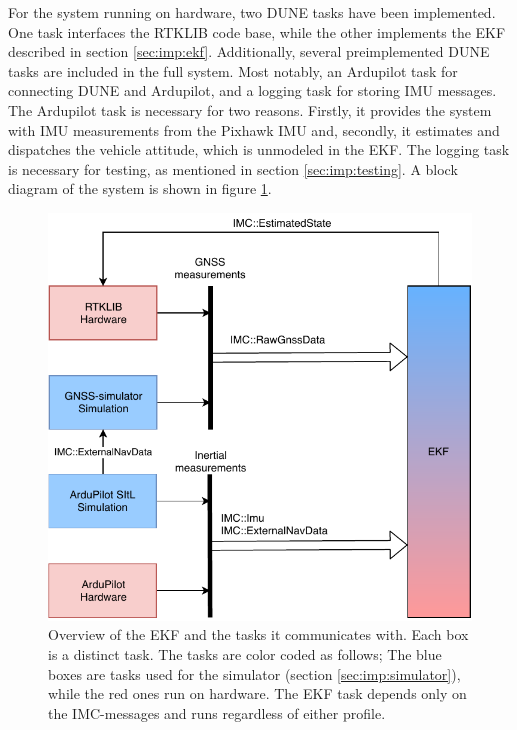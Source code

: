    
For the system running on hardware, two DUNE tasks have been implemented. One task interfaces the RTKLIB code base, while the other implements the EKF described in section \ref{sec:imp:ekf}. Additionally, several preimplemented DUNE tasks are included in the full system. Most notably, an Ardupilot task for connecting DUNE and Ardupilot, and a logging task for storing IMU messages. The Ardupilot task is necessary for two reasons. Firstly, it provides the system with IMU measurements from the Pixhawk IMU and, secondly, it estimates and dispatches the vehicle attitude, which is unmodeled in the EKF. The logging task is necessary for testing, as mentioned in section \ref{sec:imp:testing}. A block diagram of the system is shown in figure \ref{fig:dune-tasks}.\\

    \begin{figure}[!htbp]
    \centering
    \includegraphics[scale=0.8]{Implementation/Images/dune-tasks.pdf}
    \caption[Block diagram of the implemented system]{Overview of the EKF and the tasks it communicates with. Each box is a distinct task. The tasks are color coded as follows; The blue boxes are tasks used for the simulator (section \ref{sec:imp:simulator}), while the red ones run on hardware. The EKF task depends only on the IMC-messages and runs regardless of either profile.}
    \label{fig:dune-tasks}
    \end{figure}


